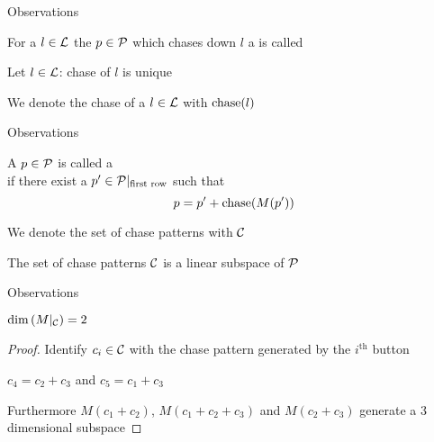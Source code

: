 \begin{frame}{Observations}
	\begin{definition}
		For a $l \in \mathcal{L}$ the $p \in \mathcal{P}$ which chases down $l$ a
		is called 
	\end{definition}
	
	\bigskip
	
	\begin{theorem}
		Let $l \in \mathcal{L}$: chase of $l$ is unique
	\end{theorem}
	
	\bigskip

	We denote the chase of a $l \in \mathcal{L}$ with $\operatorname{chase}(l)$
\end{frame}

\begin{frame}{Observations}
	\begin{definition}
		A $p \in \mathcal{P}$ is called a \structure{chase pattern}\\
		if there exist a $p' \in \mathcal{P}|_{\text{first row}}$ such that
		\[
			p = p' + \operatorname{chase}(M(p'))
		\]
	\end{definition}
	
	\bigskip
	
	We denote the set of chase patterns with $\mathcal{C}$
	
	\bigskip
	
	\begin{theorem}
		The set of chase patterns $\mathcal{C}$ is a linear subspace of $\mathcal{P}$
	\end{theorem}
\end{frame}

\begin{frame}{Observations}
	\begin{theorem}
		$\dim\left(M|_{\mathcal{C}}\right) = 2$
	\end{theorem}
	\begin{proof}
		Identify $c_{i} \in \mathcal{C}$ with the chase pattern generated by
		the $i^{\text{th}}$ button
		
		$c_{4} = c_{2} + c_{3}$ and $c_{5} = c_{1} + c_{3}$
		
		Furthermore $M(c_{1} + c_{2})$, $M(c_{1} + c_{2} + c_{3})$ and
		$M(c_{2} + c_{3})$ generate a 3 dimensional subspace
	\end{proof}
\end{frame}


